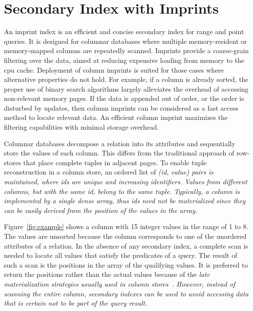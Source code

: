 \section{Secondary Index with Imprints}\label{sec:construction}

An imprint index is an efficient and concise secondary index for range and
point queries. It is designed for columnar databases where multiple
memory-resident or memory-mapped columns are repeatedly scanned.
Imprints provide a coarse-grain filtering over the data, aimed at
reducing expensive loading from memory to the cpu cache. Deployment of column
imprints is suited for those cases where alternative properties do not hold.
For example, if a column is already sorted, the proper use of binary search
algorithms largely alleviates the overhead of accessing non-relevant memory
pages. If the data is appended out of order, or the order is disturbed by
updates, then column imprints can be considered as a fast access method to
locate relevant data. An efficient column imprint maximizes the filtering
capabilities with minimal storage overhead.

Columnar databases decompose a relation into its attributes and sequentially
store the values of each column. This differs from the traditional approach of
row-stores that place complete tuples in adjacent pages. To enable tuple
reconstruction in a column store, an ordered list of \it{(id, value)} pairs is
maintained, where \it{id}s are unique and increasing identifiers. Values from
different columns, but with the same \it{id}, belong to the same tuple.
Typically, a column is implemented by a single dense array, thus \it{id}s need
not be materialized since they can be easily derived from the position of the
values in the array.
%

Figure~\ref{fig:example} shows a column with 15 integer values in the range
of 1 to 8. The values are unsorted because the column corresponds to one of the
unordered attributes of a relation. In the absence of any secondary index, a
complete scan is needed to locate all values that satisfy the predicates of a
query. The result of such a scan is the positions in the array of the qualifying
values. It is preferred to return the positions rather than the actual values
because of the \it{late materialization} strategies usually used in column
stores~\cite{AMD+07}. However, instead of scanning the entire column, secondary
indexes can be used to avoid accessing data that is certain not to be part
of the query result.

